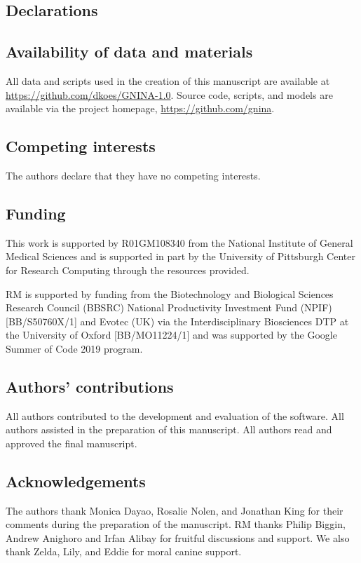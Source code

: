 \documentclass[linenumbers,doublespacing]{bmcart}
\begin{document}
\begin{backmatter}




\section*{Declarations}
\subsection*{Availability of data and materials}
All data and scripts used in the creation of this manuscript are available at \url{https://github.com/dkoes/GNINA-1.0}.  Source code, scripts, and models are available via the project homepage, \url{https://github.com/gnina}. 

\subsection*{Competing interests}
The authors declare that they have no competing interests.

\subsection*{Funding}
This work is supported by R01GM108340 from the National Institute of General Medical Sciences and is supported in part by the University of Pittsburgh Center for Research Computing through the resources provided.

RM is supported  by  funding  from  the  Biotechnology  and  Biological  Sciences  Research Council (BBSRC) National Productivity Investment Fund (NPIF) [BB/S50760X/1] and Evotec (UK) via the Interdisciplinary Biosciences DTP at the University of Oxford [BB/MO11224/1] and was supported by the Google Summer of Code 2019 program.

\subsection*{Authors' contributions}
 All authors contributed to the development and evaluation of the software. All authors assisted in the preparation of this manuscript. All authors read and approved the final manuscript.
 
\subsection*{Acknowledgements}
The authors thank Monica Dayao, Rosalie Nolen, and Jonathan King for their comments during the preparation of the manuscript. RM thanks Philip Biggin, Andrew Anighoro and Irfan Alibay for fruitful discussions and support. We also thank Zelda, Lily, and Eddie for moral canine support.




\end{backmatter}
\end{document}
